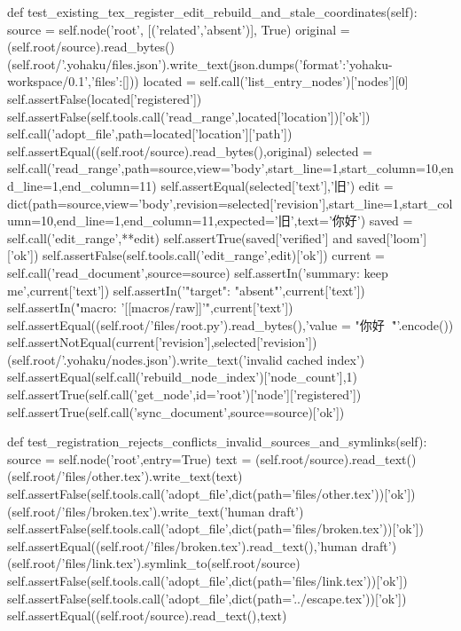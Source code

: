     def test_existing_tex_register_edit_rebuild_and_stale_coordinates(self):
        source = self.node('root', [('related','absent')], True)
        original = (self.root/source).read_bytes()
        (self.root/'.yohaku/files.json').write_text(json.dumps({'format':'yohaku-workspace/0.1','files':[]}))
        located = self.call('list_entry_nodes')['nodes'][0]
        self.assertFalse(located['registered'])
        self.assertFalse(self.tools.call('read_range',located['location'])['ok'])
        self.call('adopt_file',path=located['location']['path'])
        self.assertEqual((self.root/source).read_bytes(),original)
        selected = self.call('read_range',path=source,view='body',start_line=1,start_column=10,end_line=1,end_column=11)
        self.assertEqual(selected['text'],'旧')
        edit = dict(path=source,view='body',revision=selected['revision'],start_line=1,start_column=10,end_line=1,end_column=11,expected='旧',text='你好')
        saved = self.call('edit_range',**edit)
        self.assertTrue(saved['verified'] and saved['loom']['ok'])
        self.assertFalse(self.tools.call('edit_range',edit)['ok'])
        current = self.call('read_document',source=source)
        self.assertIn('summary: keep me',current['text'])
        self.assertIn('"target": "absent"',current['text'])
        self.assertIn("macro: '[[macros/raw]]'",current['text'])
        self.assertEqual((self.root/'files/root.py').read_bytes(),'value = "你好 🧸"\r\n'.encode())
        self.assertNotEqual(current['revision'],selected['revision'])
        (self.root/'.yohaku/nodes.json').write_text('invalid cached index')
        self.assertEqual(self.call('rebuild_node_index')['node_count'],1)
        self.assertTrue(self.call('get_node',id='root')['node']['registered'])
        self.assertTrue(self.call('sync_document',source=source)['ok'])

    def test_registration_rejects_conflicts_invalid_sources_and_symlinks(self):
        source = self.node('root',entry=True)
        text = (self.root/source).read_text()
        (self.root/'files/other.tex').write_text(text)
        self.assertFalse(self.tools.call('adopt_file',dict(path='files/other.tex'))['ok'])
        (self.root/'files/broken.tex').write_text('human draft')
        self.assertFalse(self.tools.call('adopt_file',dict(path='files/broken.tex'))['ok'])
        self.assertEqual((self.root/'files/broken.tex').read_text(),'human draft')
        (self.root/'files/link.tex').symlink_to(self.root/source)
        self.assertFalse(self.tools.call('adopt_file',dict(path='files/link.tex'))['ok'])
        self.assertFalse(self.tools.call('adopt_file',dict(path='../escape.tex'))['ok'])
        self.assertEqual((self.root/source).read_text(),text)


